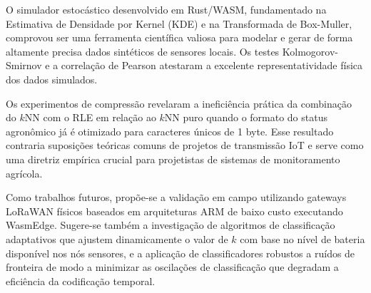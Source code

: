 \documentclass[
	12pt,
	openright,
	oneside,
	a4paper,
	english,
	brazil
	]{abntex2}
\begin{document}
O simulador estocástico desenvolvido em Rust/WASM, fundamentado na Estimativa de Densidade por Kernel (KDE) e na Transformada de Box-Muller, comprovou ser uma ferramenta científica valiosa para modelar e gerar de forma altamente precisa dados sintéticos de sensores locais. Os testes Kolmogorov-Smirnov e a correlação de Pearson atestaram a excelente representatividade física dos dados simulados.

Os experimentos de compressão revelaram a ineficiência prática da combinação do $k$NN com o RLE em relação ao $k$NN puro quando o formato do status agronômico já é otimizado para caracteres únicos de 1 byte. Esse resultado contraria suposições teóricas comuns de projetos de transmissão IoT e serve como uma diretriz empírica crucial para projetistas de sistemas de monitoramento agrícola.

Como trabalhos futuros, propõe-se a validação em campo utilizando gateways LoRaWAN físicos baseados em arquiteturas ARM de baixo custo executando WasmEdge. Sugere-se também a investigação de algoritmos de classificação adaptativos que ajustem dinamicamente o valor de $k$ com base no nível de bateria disponível nos nós sensores, e a aplicação de classificadores robustos a ruídos de fronteira de modo a minimizar as oscilações de classificação que degradam a eficiência da codificação temporal.


\end{document}
